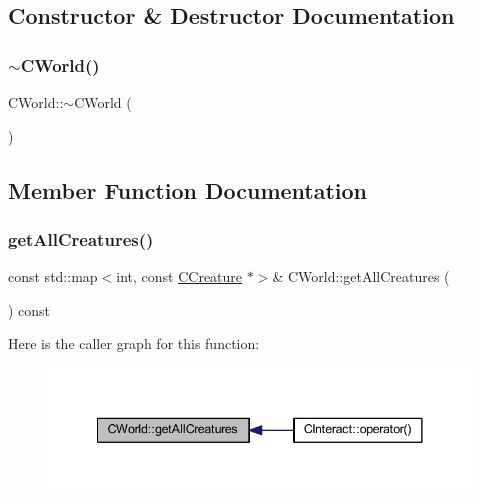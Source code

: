 \subsection{Constructor \& Destructor Documentation}
\mbox{\label{class_c_world_ac7905380d07d6f907b7f18db4e6442df}} 
\subsubsection{\texorpdfstring{$\sim$\+C\+World()}{~CWorld()}}
{\footnotesize\ttfamily C\+World\+::$\sim$\+C\+World (\begin{DoxyParamCaption}{ }\end{DoxyParamCaption})}



\subsection{Member Function Documentation}
\mbox{\label{class_c_world_aaf3f4f470883d06d0b37498ba3816430}} 
\subsubsection{\texorpdfstring{get\+All\+Creatures()}{getAllCreatures()}}
{\footnotesize\ttfamily const std\+::map$<$int, const \mbox{\hyperlink{class_c_creature}{C\+Creature}} $\ast$$>$\& C\+World\+::get\+All\+Creatures (\begin{DoxyParamCaption}{ }\end{DoxyParamCaption}) const\hspace{0.3cm}{\ttfamily [inline]}}

Here is the caller graph for this function\+:\nopagebreak
\begin{figure}[H]
\begin{center}
\leavevmode
\includegraphics[width=341pt]{class_c_world_aaf3f4f470883d06d0b37498ba3816430_icgraph}
\end{center}
\end{figure}
\mbox{\label{class_c_world_a325d979d0d2b15db1e3badec7201c960}} 
